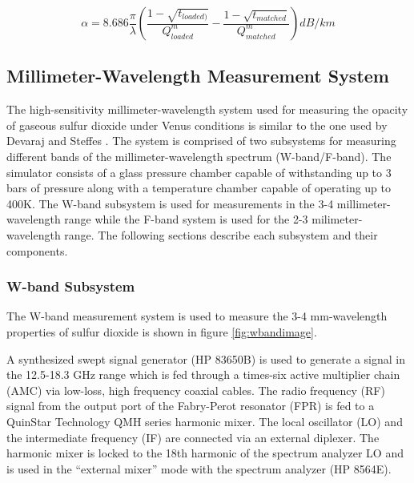 \begin{equation} \label{eq:alphamatch}
\alpha = 8.686 \frac{\pi}{\lambda}\left(\frac{1 - \sqrt{t_{loaded)}}}{Q^m_{loaded}} - \frac{1-\sqrt{t_{matched}}}{Q_{matched}^m} \right) dB/km
\end{equation}

\subsection{Millimeter-Wavelength Measurement System}

The high-sensitivity millimeter-wavelength system used for measuring the opacity of gaseous sulfur dioxide under Venus conditions is similar to the one used by Devaraj and Steffes \cite{system-description} \cite{Devaraj-thesis}. The system is comprised of two subsystems for measuring different bands of the millimeter-wavelength spectrum (W-band/F-band). The simulator consists of a glass pressure chamber capable of withstanding up to 3 bars of pressure along with a temperature chamber capable of operating up to 400K. The W-band subsystem is used for measurements in the 3-4 millimeter-wavelength range while the F-band system is used for the 2-3 milimeter-wavelength range. The following sections describe each subsystem and their components. 

\subsubsection{W-band Subsystem}

The W-band measurement system is used to measure the 3-4 mm-wavelength properties of sulfur dioxide is shown in figure \ref{fig:wbandimage}.

A synthesized swept signal generator (HP 83650B) is used to generate a signal in the 12.5-18.3 GHz range which is fed through a times-six active multiplier chain (AMC) via low-loss, high frequency coaxial cables. The radio frequency (RF) signal from the output port of the Fabry-Perot resonator (FPR) is fed to a QuinStar Technology QMH series harmonic mixer. The local oscillator (LO) and the intermediate frequency (IF) are connected via an external diplexer. The harmonic mixer is locked to the 18th harmonic of the spectrum analyzer LO and is used in the ``external mixer'' mode with the spectrum analyzer (HP 8564E). 

